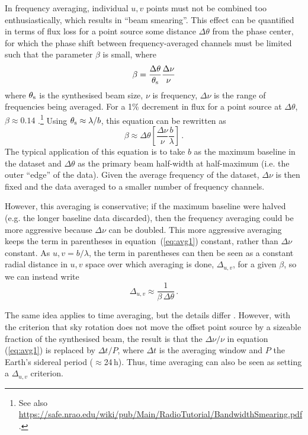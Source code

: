 \documentclass[fleqn,usenatbib]{mnras}
\begin{document}
In frequency averaging, individual $u,v$ points must not be combined too enthusiastically, which results in ``beam smearing''. This effect can be quantified in terms of flux loss for a point source some distance $\Delta \theta$ from the phase center, for which the phase shift between frequency-averaged channels must be limited such that the parameter $\beta$ is small, where
\begin{equation}
    \beta = \frac{\Delta \theta}{\theta_{\rm s}} \frac{\Delta \nu}{\nu}
\end{equation}
where $\theta_{\rm s}$ is the synthesised beam size, $\nu$ is frequency, $\Delta \nu$ is the range of frequencies being averaged. For a 1\% decrement in flux for a point source at $\Delta \theta$, $\beta \approx 0.14$ \citep{1989ASPC....6..247B}.\footnote{See also \href{https://safe.nrao.edu/wiki/pub/Main/RadioTutorial/BandwidthSmearing.pdf}{https://safe.nrao.edu/wiki/pub/Main/RadioTutorial/BandwidthSmearing.pdf}.} Using $\theta_{\rm s} \approx \lambda/b$, this equation can be rewritten as
\begin{equation}\label{eq:avg1}
    \beta \approx \Delta \theta \left[ \frac{\Delta \nu}{\nu} \frac{b}{\lambda} \right] \, .
\end{equation}
The typical application of this equation is to take $b$ as the maximum baseline in the dataset and $\Delta \theta$ as the primary beam half-width at half-maximum (i.e. the outer ``edge'' of the data). Given the average frequency of the dataset, $\Delta \nu$ is then fixed and the data averaged to a smaller number of frequency channels.

However, this averaging is conservative; if the maximum baseline were halved (e.g. the longer baseline data discarded), then the frequency averaging could be more aggressive because $\Delta \nu$ can be doubled. This more aggressive averaging keeps the term in parentheses in equation~(\ref{eq:avg1}) constant, rather than $\Delta \nu$ constant. As $u,v = b/\lambda$, the term in parentheses can then be seen as a constant radial distance in $u,v$ space over which averaging is done, $\Delta_{u,v}$, for a given $\beta$, so we can instead write
\begin{equation}\label{eq:avg2}
    \Delta_{u,v} \approx \frac{1}{\beta \, \Delta \theta} \, .
\end{equation}

The same idea applies to time averaging, but the details differ \citep{1989ASPC....6..247B}. However, with the criterion that sky rotation does not move the offset point source by a sizeable fraction of the synthesised beam, the result is that the $\Delta \nu / \nu$ in equation (\ref{eq:avg1}) is replaced by $\Delta t / P$, where $\Delta t$ is the averaging window and $P$ the Earth's sidereal period ($\approx$24\,h). Thus, time averaging can also be seen as setting a $\Delta_{u,v}$ criterion.
\end{document}
